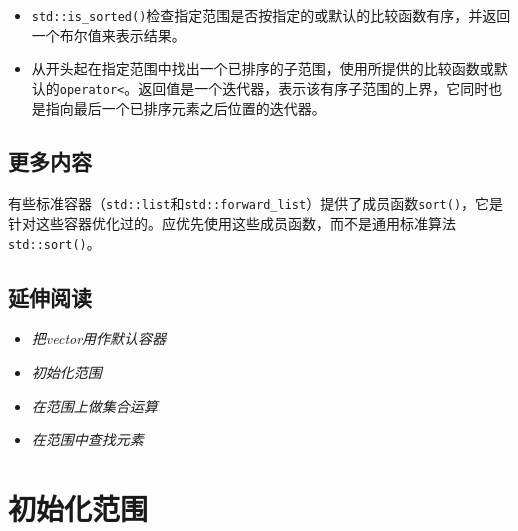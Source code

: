 \begin{itemize}

\item \texttt{std::\allowbreak{}is\_\allowbreak{}sorted()}检查指定范围是否按指定的或默认的比较函数有序，并返回一个布尔值来表示结果。



\item {}从开头起在指定范围中找出一个已排序的子范围，使用所提供的比较函数或默认的\texttt{operator<}。返回值是一个迭代器，表示该有序子范围的上界，它同时也是指向最后一个已排序元素之后位置的迭代器。

\end{itemize}



\subsection{更多内容}



有些标准容器（\texttt{std::\allowbreak{}list}和\texttt{std::\allowbreak{}forward\_\allowbreak{}list}）提供了成员函数\texttt{sort()}，它是针对这些容器优化过的。应优先使用这些成员函数，而不是通用标准算法\texttt{std::\allowbreak{}sort()}。



\subsection{延伸阅读}



\begin{itemize}
\item \textit{把vector用作默认容器}



\item \textit{初始化范围}



\item \textit{在范围上做集合运算}



\item \textit{在范围中查找元素}

\end{itemize}



\section{初始化范围}



